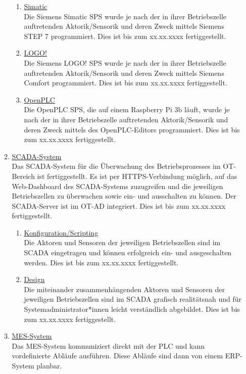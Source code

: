 \documentclass[
	headings=optiontotocandhead,%
	oneside,
	numbers=noenddot,%
	toc=flat, %
	10pt, %
	parskip=full, %
	listof=totoc, %
	listof=flat, %
	numbers=noenddot, %
	bibliography=totoc, %
	a4paper,DIV=14,
]{scrartcl}
\begin{document}
\begin{enumerate}[start=1,label={\bfseries Ziel-H \arabic*},leftmargin=*,wide]
\begin{enumerate}[label=\alph*.]
\begin{enumerate}[label=\roman*.]
\item{\underline{Simatic}}\\
Die Siemens Simatic SPS wurde je nach der in ihrer Betriebszelle auftretenden Aktorik/Sensorik und deren Zweck mittels Siemens STEP 7 programmiert. Dies ist bis zum xx.xx.xxxx fertiggestellt.

\item{\underline{LOGO!}}\\
Die Siemens LOGO! SPS wurde je nach der in ihrer Betriebszelle auftretenden Aktorik/Sensorik und deren Zweck mittels Siemens Comfort programmiert. Dies ist bis zum xx.xx.xxxx fertiggestellt.

\item{\underline{OpenPLC}}\\
Die OpenPLC SPS, die auf einem Raspberry Pi 3b läuft, wurde je nach der in ihrer Betriebszelle auftretenden Aktorik/Sensorik und deren Zweck mittels des OpenPLC-Editors programmiert. Dies ist bis zum xx.xx.xxxx fertiggestellt.
\end{enumerate}

\item{\underline{SCADA-System}}\\
Das SCADA-System für die Überwachung des Betriebsprozesses im OT-Bereich ist fertiggestellt. Es ist per HTTPS-Verbindung möglich, auf das Web-Dashboard des SCADA-Systems zuzugreifen und die jeweiligen Betriebszellen zu überwachen sowie ein- und ausschalten zu können. Der SCADA-Server ist im OT-AD integriert. Dies ist bis zum xx.xx.xxxx fertiggestellt.

\begin{enumerate}[label=\roman*.]
\item{\underline{Konfiguration/Scripting}}\\
Die Aktoren und Sensoren der jeweiligen Betriebszellen sind im SCADA eingetragen und können erfolgreich ein- und ausgeschalten werden. Dies ist bis zum xx.xx.xxxx fertiggestellt.

\item{\underline{Design}}\\
Die miteinander zusammenhängenden Aktoren und Sensoren der jeweiligen Betriebszellen sind im SCADA grafisch realitätsnah und für Systemadministrator*innen leicht verständlich abgebildet. Dies ist bis zum xx.xx.xxxx fertiggestellt.
\end{enumerate}

\item{\underline{MES-System}}\\
Das MES-System kommuniziert direkt mit der PLC und kann vordefinierte Abläufe ausführen. Diese Abläufe sind dann von einem ERP-System planbar. 


\end{enumerate}
\end{enumerate}
\end{document}
